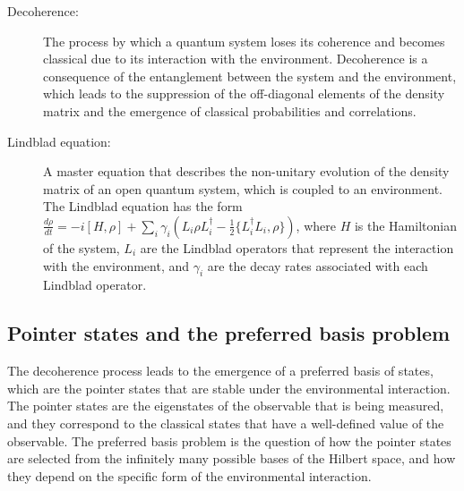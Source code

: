 \begin{tcolorbox}[colback=blue!5!white,colframe=blue!75!black,title=New terms]
\begin{description}
\item[Decoherence:] The process by which a quantum system loses its coherence and becomes classical due to its interaction with the environment. Decoherence is a consequence of the entanglement between the system and the environment, which leads to the suppression of the off-diagonal elements of the density matrix and the emergence of classical probabilities and correlations.
\item[Lindblad equation:] A master equation that describes the non-unitary evolution of the density matrix of an open quantum system, which is coupled to an environment. The Lindblad equation has the form $\frac{d\rho}{dt} = -i[H,\rho] + \sum_i \gamma_i (L_i \rho L_i^\dagger - \frac{1}{2}\{L_i^\dagger L_i,\rho\})$, where $H$ is the Hamiltonian of the system, $L_i$ are the Lindblad operators that represent the interaction with the environment, and $\gamma_i$ are the decay rates associated with each Lindblad operator.
\end{description}
\end{tcolorbox}

\subsection{Pointer states and the preferred basis problem}
The decoherence process leads to the emergence of a preferred basis of states, which are the pointer states that are stable under the environmental interaction. The pointer states are the eigenstates of the observable that is being measured, and they correspond to the classical states that have a well-defined value of the observable. The preferred basis problem is the question of how the pointer states are selected from the infinitely many possible bases of the Hilbert space, and how they depend on the specific form of the environmental interaction.

